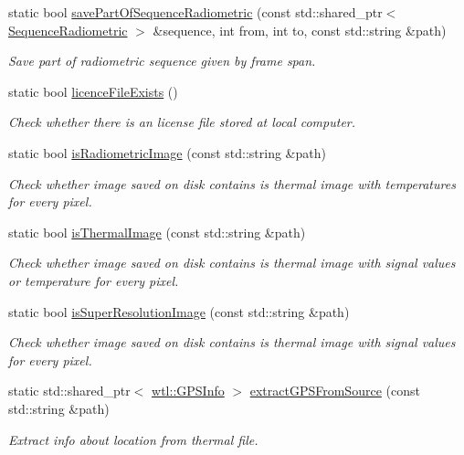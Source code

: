 \begin{DoxyCompactItemize}
static bool \hyperlink{classwtl_1_1_center_a64612b4a2be3275d453ea99b8c8395ea}{save\+Part\+Of\+Sequence\+Radiometric} (const std\+::shared\+\_\+ptr$<$ \hyperlink{classwtl_1_1_sequence_radiometric}{Sequence\+Radiometric} $>$ \&sequence, int from, int to, const std\+::string \&path)
\begin{DoxyCompactList}\small\item\em Save part of radiometric sequence given by frame span. \end{DoxyCompactList}\item 
static bool \hyperlink{classwtl_1_1_center_a96d895bb3a977d2f69a72f688b0174c2}{licence\+File\+Exists} ()
\begin{DoxyCompactList}\small\item\em Check whether there is an license file stored at local computer. \end{DoxyCompactList}\item 
static bool \hyperlink{classwtl_1_1_center_aa05f3d730217ce0208b3e290a3590e2a}{is\+Radiometric\+Image} (const std\+::string \&path)
\begin{DoxyCompactList}\small\item\em Check whether image saved on disk contains is thermal image with temperatures for every pixel. \end{DoxyCompactList}\item 
static bool \hyperlink{classwtl_1_1_center_a545bc4811dbd26759f3795a7ac65b8dc}{is\+Thermal\+Image} (const std\+::string \&path)
\begin{DoxyCompactList}\small\item\em Check whether image saved on disk contains is thermal image with signal values or temperature for every pixel. \end{DoxyCompactList}\item 
static bool \hyperlink{classwtl_1_1_center_a83518abd0aee527ce310515bd02d37c5}{is\+Super\+Resolution\+Image} (const std\+::string \&path)
\begin{DoxyCompactList}\small\item\em Check whether image saved on disk contains is thermal image with signal values for every pixel. \end{DoxyCompactList}\item 
static std\+::shared\+\_\+ptr$<$ \hyperlink{classwtl_1_1_g_p_s_info}{wtl\+::\+G\+P\+S\+Info} $>$ \hyperlink{classwtl_1_1_center_a8654e8a2d882192bd9d9400965d1b916}{extract\+G\+P\+S\+From\+Source} (const std\+::string \&path)
\begin{DoxyCompactList}\small\item\em Extract info about location from thermal file. \end{DoxyCompactList}\end{DoxyCompactItemize}


